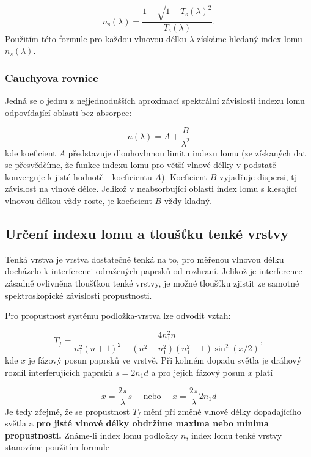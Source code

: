\documentclass[czech,11pt,a4paper]{article}
\begin{document}
\begin{multicols}{2}
	\begin{equation}
		n_{\mathrm{s}}(\lambda)=\frac{1+\sqrt{1-T_{\mathrm{s}}(\lambda)^{2}}}{T_{\mathrm{s}}(\lambda)}.
	\end{equation}
	Použitím této formule pro každou vlnovou délku $\lambda$ získáme hledaný index lomu $n_s(\lambda)$.
	\subsubsection{Cauchyova rovnice}
	Jedná se o jednu z nejjednodušších aproximací spektrální závislosti indexu lomu odpovídající oblasti bez absorpce:
	
	\begin{equation}
		n(\lambda)=A+\frac{B}{\lambda^{2}} 
	\end{equation}
	kde koeficient $A$ představuje dlouhovlnnou limitu indexu lomu (ze získaných dat se přesvědčíme, že funkce indexu lomu pro větší vlnové délky v podstatě konverguje k jisté hodnotě - koeficientu $A$). Koeficient $B$ vyjadřuje dispersi, tj závislost na vlnové délce. Jelikož v neabsorbující oblasti index lomu s klesající vlnovou délkou vždy roste,  je koeficient $B$ vždy kladný.
	
	\subsection{Určení indexu lomu a tloušťku tenké vrstvy}
	Tenká vrstva je vrstva dostatečně tenká na to, pro měřenou vlnovou délku docházelo k interferenci odražených paprsků od rozhraní. Jelikož je interference zásadně ovlivněna tloušťkou tenké vrstvy, je možné tloušťku zjistit ze samotné spektroskopické závislosti propustnosti. 
	
	Pro propustnost systému podložka-vrstva lze odvodit vztah:
	

{\small \begin{equation}
		T_{f}=\frac{4 n_{1}^{2} n}{n_{1}^{2}(n+1)^{2}-\left(n^{2}-n_{1}^{2}\right)\left(n_{1}^{2}-1\right) \sin ^{2}(x / 2)},
\end{equation}}
kde $x$ je fázový posun paprsků ve vrstvě. Při kolmém dopadu světla je dráhový rozdíl interferujících paprsků $s = 2n_1d$ a pro jejich fázový posun $x$ platí

\begin{equation}
	x=\frac{2 \pi}{\lambda} s \quad \text { nebo } \quad x=\frac{2 \pi}{\lambda} 2 n_{1} d
\end{equation}
Je tedy zřejmé, že se propustnost $T_f$ mění při změně vlnové délky dopadajícího světla a \textbf{pro jisté vlnové délky obdržíme maxima nebo minima propustnosti.}
Známe-li index lomu podložky $n$, index lomu tenké vrstvy stanovíme použitím formule 


\end{multicols}
\end{document}
